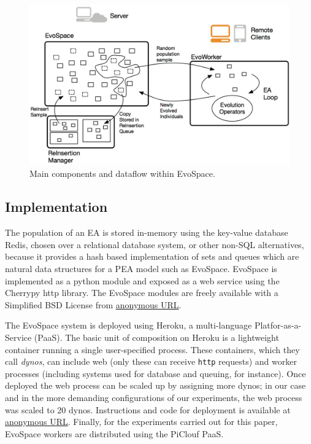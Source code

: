 \documentclass{sig-alternate}
\begin{document}
\begin{figure}[t]
    \centering
        \includegraphics[width=5in]{eps/evospaceExample.eps}
    \caption{Main components and dataflow within EvoSpace.}
    \label{fig:evo}
\end{figure}


\subsection{Implementation}
The population of an EA is stored in-memory using the key-value database Redis, chosen over a relational database system, or other non-SQL 
alternatives, because it provides a hash based implementation of sets  and queues which are natural data structures for a PEA model such as EvoSpace. 
EvoSpace is implemented as a python module and exposed as a web service using the Cherrypy http library.
The EvoSpace modules are freely available with  a Simplified BSD License from \url{anonymous URL}.

The EvoSpace system is deployed using Heroku, a multi-language Platfor-as-a-Service (PaaS).
The basic unit of composition on
Heroku is a lightweight container running a single user-specified process.
These containers, which they call {\em dynos}, can include web (only these can receive {\tt http} requests) and worker processes
(including systems used for database and queuing, for instance).
Once deployed the web process can be scaled up by assigning more dynos;
in our case and in the more demanding configurations of our experiments, 
the web process was scaled to 20 dynos. Instructions and code for deployment 
is available at \url{anonymous URL}.
Finally, for the experiments carried out for this paper, EvoSpace workers are distributed using the PiClouf PaaS.
\end{document}
